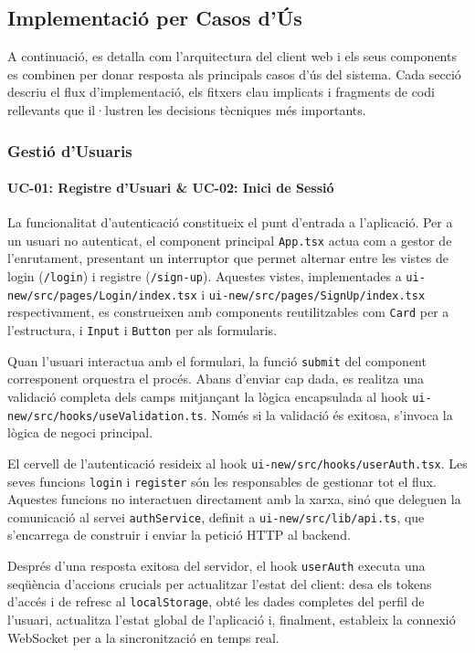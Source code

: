 \subsection{Implementació per Casos d'Ús}
A continuació, es detalla com l'arquitectura del client web i els seus components es combinen per donar resposta als principals casos d'ús del sistema. Cada secció descriu el flux d'implementació, els fitxers clau implicats i fragments de codi rellevants que il·lustren les decisions tècniques més importants.

\subsubsection{Gestió d'Usuaris}

\paragraph{UC-01: Registre d'Usuari \& UC-02: Inici de Sessió}
La funcionalitat d'autenticació constitueix el punt d'entrada a l'aplicació. Per a un usuari no autenticat, el component principal \texttt{App.tsx} actua com a gestor de l'enrutament, presentant un interruptor que permet alternar entre les vistes de login (\texttt{/login}) i registre (\texttt{/sign-up}). Aquestes vistes, implementades a \texttt{ui-new/src/pages/Login/index.tsx} i \texttt{ui-new/src/pages/SignUp/index.tsx} respectivament, es construeixen amb components reutilitzables com \texttt{Card} per a l'estructura, i \texttt{Input} i \texttt{Button} per als formularis.

Quan l'usuari interactua amb el formulari, la funció \texttt{submit} del component corresponent orquestra el procés. Abans d'enviar cap dada, es realitza una validació completa dels camps mitjançant la lògica encapsulada al hook \texttt{ui-new/src/hooks/useValidation.ts}. Només si la validació és exitosa, s'invoca la lògica de negoci principal.

El cervell de l'autenticació resideix al hook \texttt{ui-new/src/hooks/userAuth.tsx}. Les seves funcions \texttt{login} i \texttt{register} són les responsables de gestionar tot el flux. Aquestes funcions no interactuen directament amb la xarxa, sinó que deleguen la comunicació al servei \texttt{authService}, definit a \texttt{ui-new/src/lib/api.ts}, que s'encarrega de construir i enviar la petició HTTP al backend.

Després d'una resposta exitosa del servidor, el hook \texttt{userAuth} executa una seqüència d'accions crucials per actualitzar l'estat del client: desa els tokens d'accés i de refresc al \texttt{localStorage}, obté les dades completes del perfil de l'usuari, actualitza l'estat global de l'aplicació i, finalment, estableix la connexió WebSocket per a la sincronització en temps real.

